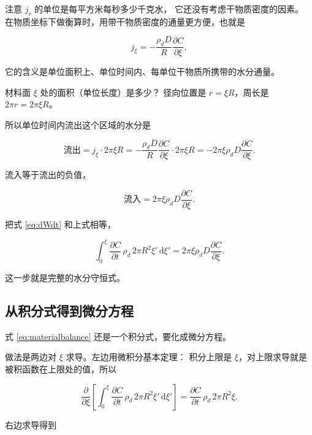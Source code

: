 注意 $j_r$ 的单位是每平方米每秒多少千克水，
它还没有考虑干物质密度的因素。
在物质坐标下做衡算时，用带干物质密度的通量更方便，也就是

\begin{equation}
j_\xi = -\frac{\rho_d D}{R}\frac{\partial C}{\partial \xi},
\end{equation}

它的含义是单位面积上、单位时间内、每单位干物质所携带的水分通量。

材料面 $\xi$ 处的面积（单位长度）是多少？
径向位置是 $r=\xi R$，周长是 $2\pi r = 2\pi\xi R$。

所以单位时间内流出这个区域的水分是

\begin{equation}
\text{流出} = j_\xi\cdot 2\pi\xi R
= -\frac{\rho_d D}{R}\frac{\partial C}{\partial \xi}\cdot 2\pi\xi R
= -2\pi\xi\rho_d D\frac{\partial C}{\partial \xi}.
\end{equation}

流入等于流出的负值，

\begin{equation}
\text{流入} = 2\pi\xi\rho_d D\frac{\partial C}{\partial \xi}.
\end{equation}

把式 \eqref{eq:dWdt} 和上式相等，

\begin{equation}
\int_0^\xi \frac{\partial C}{\partial t}\,\rho_d\,2\pi R^2\xi'\,\mathrm{d}\xi'
= 2\pi\xi\rho_d D\frac{\partial C}{\partial \xi}.
\label{eq:materialbalance}
\end{equation}

这一步就是完整的水分守恒式。

\subsection{从积分式得到微分方程}

式 \eqref{eq:materialbalance} 还是一个积分式，要化成微分方程。

做法是两边对 $\xi$ 求导。左边用微积分基本定理：
积分上限是 $\xi$，对上限求导就是被积函数在上限处的值，所以

\begin{equation}
\frac{\partial}{\partial \xi}\left[\int_0^\xi \frac{\partial C}{\partial t}\,\rho_d\,2\pi R^2\xi'\,\mathrm{d}\xi'\right]
= \frac{\partial C}{\partial t}\,\rho_d\,2\pi R^2\xi .
\end{equation}

右边求导得到

